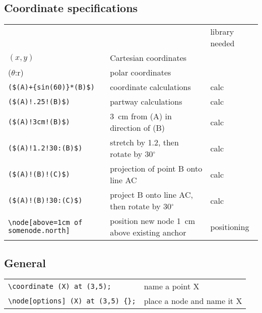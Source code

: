 \subsection{Coordinate specifications}
\begin{tabular}[]{p{}p{}l}
&&library needed\\
$(x,y)$&Cartesian coordinates&\\
($\theta$:r)&polar coordinates&\\
\verb |($(A)+{sin(60)}*(B)$)|         &coordinate calculations&calc\\
\verb |($(A)!.25!(B)$)|&                 partway calculations&calc\\
\verb |($(A)!3cm!(B)$)|&                 3~cm from (A) in direction of (B)&calc\\
\verb |($(A)!1.2!30:(B)$)|&              stretch by 1.2, then rotate by 30$^{\circ}$&calc\\
\verb |($(A)!(B)!(C)$)|&                 projection of point B onto line AC&calc\\
\verb |($(A)!(B)!30:(C)$)|&              project B onto line AC, then rotate by 30$^{\circ}$&calc\\
\verb |\node[above=1cm of| \verb|somenode.north]|&position new node 1~cm above existing anchor&positioning\\
\end{tabular}

\subsection{General}
\begin{tabular}{ll}
  \verb|\coordinate (X) at (3,5);|&name a point X\\
  \verb|\node[options] (X) at (3,5) {};|&place a node and name it X\\
\end{tabular}

